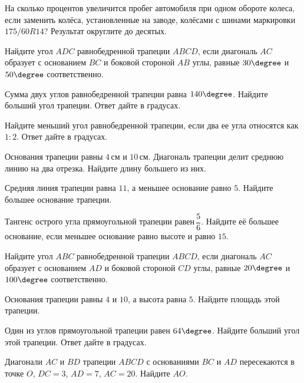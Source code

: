 \begin{class}[number=3]
\begin{listofex}
		\item На сколько процентов увеличится пробег автомобиля при одном обороте колеса, если заменить колёса, установленные на заводе, колёсами с шинами маркировки \( 175/60 R14 \)? Результат округлите до десятых.
		\item Найдите угол \( ADC \) равнобедренной трапеции \( ABCD \), если диагональ \( AC \) образует с основанием \( BC \) и боковой стороной \( AB \) углы, равные \( 30\degree \) и \( 50\degree \) соответственно.
		\item Сумма двух углов равнобедренной трапеции равна \( 140\degree \). Найдите больший угол трапеции. Ответ дайте в градусах.
		\item Найдите меньший угол равнобедренной трапеции, если два ее угла относятся как \( 1:2 \). Ответ дайте в градусах.
		\item Основания трапеции равны \( 4 \) см и \( 10 \) см. Диагональ трапеции делит среднюю линию на два отрезка. Найдите длину большего из них.
		\item Средняя линия трапеции равна \( 11 \), а меньшее основание равно \( 5 \). Найдите большее основание трапеции.
		\item Тангенс острого угла прямоугольной трапеции равен \( \dfrac{5}{6} \).  Найдите её большее основание, если меньшее основание равно высоте и равно \( 15 \).
		\item Найдите угол \( ABC \) равнобедренной трапеции \( ABCD \), если диагональ \( AC \) образует с основанием \( AD \) и боковой стороной \( CD \) углы, равные \( 20\degree \) и \( 100\degree \) соответственно.
		\item Основания трапеции равны \( 4 \) и \( 10 \), а высота равна \( 5 \). Найдите площадь этой трапеции.
		\item Один из углов прямоугольной трапеции равен \( 64\degree \). Найдите больший угол этой трапеции. Ответ дайте в градусах.
		\item Диагонали \( AC \) и \( BD \) трапеции \( ABCD \) с основаниями \( BC \) и \( AD \) пересекаются в точке \( O \), \( DC=3 \), \( AD=7 \), \( AC=20 \). Найдите \( AO \).
	\end{listofex}
\end{class}

